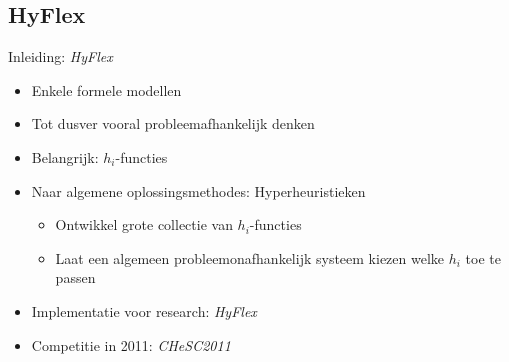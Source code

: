 \documentclass[handout]{beamer}
\begin{document}
\subsection{HyFlex}
\begin{frame}{Inleiding: \emph{HyFlex}}
\begin{itemize}[<+->]
 \item Enkele formele modellen
 \item Tot dusver vooral probleemafhankelijk denken
 \item Belangrijk: $h_i$-functies
 \item Naar algemene oplossingsmethodes: Hyperheuristieken
 \begin{itemize}
   \item Ontwikkel grote collectie van $h_i$-functies
   \item Laat een algemeen probleemonafhankelijk systeem kiezen welke $h_i$ toe te passen
 \end{itemize}
 \item Implementatie voor research: \emph{HyFlex}
 \item Competitie in 2011: \emph{CHeSC2011}
\end{itemize}
\end{frame}
\end{document}
